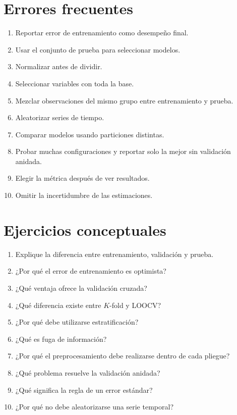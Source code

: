 \documentclass[
  spanish,
  10.5pt,
  letterpaper,
  DIV=11,
  numbers=noendperiod,
  oneside,
  open=any]{scrreprt}
\providecommand{\tightlist}{%
  \setlength{\itemsep}{0pt}\setlength{\parskip}{0pt}}
\theoremstyle{definition}
\theoremstyle{definition}
\theoremstyle{plain}
\theoremstyle{remark}
\begin{document}
\section*{Errores frecuentes}\label{errores-frecuentes-6}


\begin{enumerate}
\def\labelenumi{\arabic{enumi}.}
\tightlist
\item
  Reportar error de entrenamiento como desempeño final.
\item
  Usar el conjunto de prueba para seleccionar modelos.
\item
  Normalizar antes de dividir.
\item
  Seleccionar variables con toda la base.
\item
  Mezclar observaciones del mismo grupo entre entrenamiento y prueba.
\item
  Aleatorizar series de tiempo.
\item
  Comparar modelos usando particiones distintas.
\item
  Probar muchas configuraciones y reportar solo la mejor sin validación
  anidada.
\item
  Elegir la métrica después de ver resultados.
\item
  Omitir la incertidumbre de las estimaciones.
\end{enumerate}

\section*{Ejercicios conceptuales}\label{ejercicios-conceptuales-6}


\begin{enumerate}
\def\labelenumi{\arabic{enumi}.}
\tightlist
\item
  Explique la diferencia entre entrenamiento, validación y prueba.
\item
  ¿Por qué el error de entrenamiento es optimista?
\item
  ¿Qué ventaja ofrece la validación cruzada?
\item
  ¿Qué diferencia existe entre \(K\)-fold y LOOCV?
\item
  ¿Por qué debe utilizarse estratificación?
\item
  ¿Qué es fuga de información?
\item
  ¿Por qué el preprocesamiento debe realizarse dentro de cada pliegue?
\item
  ¿Qué problema resuelve la validación anidada?
\item
  ¿Qué significa la regla de un error estándar?
\item
  ¿Por qué no debe aleatorizarse una serie temporal?
\end{enumerate}
\end{document}
